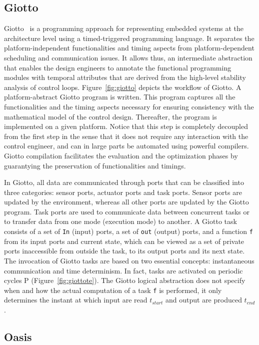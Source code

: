 \subsection{Giotto}
Giotto~\cite{intro:giotto} is a programming approach for representing embedded systems
at the architecture level using a timed-triggered programming language. It separates the
platform-independent functionalities and timing aspects from platform-dependent scheduling 
and communication issues. It allows thus, an intermediate abstraction that enables the 
design engineers to annotate the functional programming modules with temporal attributes that 
are derived from the high-level stability analysis of control loops. 
Figure~\ref{fig:giotto} depicts the workflow of Giotto. A platform-abstract Giotto program
is written. This program captures all the functionalities and the timing aspects necessary
for ensuring consistency with the mathematical model of the control design. Thereafter,
the program is implemented on a given platform. Notice that this step is completely decoupled
from the first step in the sense that it does not require any interaction with the control 
engineer, and can in large parts be automated using powerful compilers. 
Giotto compilation facilitates the evaluation and the optimization phases by guarantying 
the preservation of functionalities and timings. 

In Giotto, all data are communicated through ports that can be classified into three categories:
sensor ports, actuator ports and task ports. Sensor ports are updated by the environment, 
whereas all other ports are updated by the Giotto program. Task ports are used to communicate 
data between concurrent tasks or to transfer data from one mode (execution mode) to another.
A Giotto task consists of a set of \texttt{In} (input) ports, a set of \texttt{out} (output)
ports, and a function \texttt{f} from its input ports and current state, which can be viewed
as a set of private ports inaccessible from outside the task, to its output ports
and its next state. 
The invocation of Giotto tasks are based on two essential concepts: instantaneous communication
and time determinism. In fact, tasks are activated on periodic cycles P 
(Figure~\ref{fig:giottote}). The Giotto logical abstraction 
does not specify when and how the actual computation of a task \texttt{f} is performed, 
it only determines the instant at which input are read $t_{start}$ and output are produced 
$t_{end}$.

\subsection{Oasis}

